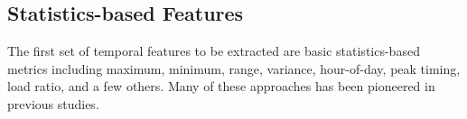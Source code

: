 \subsection{Statistics-based Features}
\label{sec:statisticsfeatures}

The first set of temporal features to be extracted are basic statistics-based metrics including maximum, minimum, range, variance, hour-of-day, peak timing, load ratio, and a few others. Many of these approaches has been pioneered in previous studies. 
